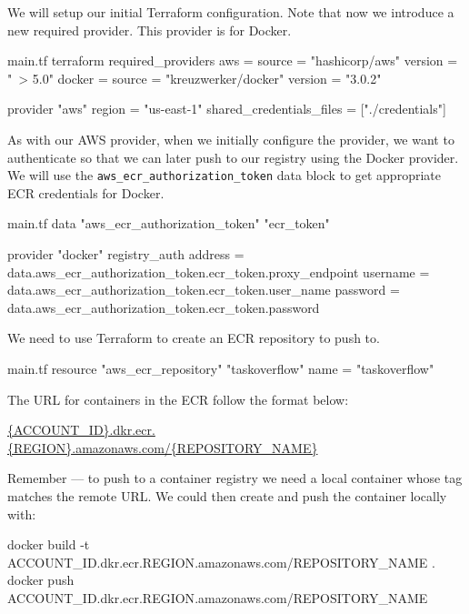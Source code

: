 \documentclass{csse4400}
\begin{document}
We will setup our initial Terraform configuration.
Note that now we introduce a new required provider.
This provider is for Docker.

\begin{code}[language=terraform,numbers=none]{main.tf}
terraform {
   required_providers {
      aws = {
         source = "hashicorp/aws"
         version = "~> 5.0"
      }
      docker = {
         source  = "kreuzwerker/docker"
         version = "3.0.2"
      }
   }
}

provider "aws" {
   region = "us-east-1"
   shared_credentials_files = ["./credentials"]
}
\end{code}

As with our AWS provider,
when we initially configure the provider,
we want to authenticate so that we can later push to our registry using the Docker provider.
We will use the \texttt{aws\_ecr\_authorization\_token} data block to get appropriate ECR credentials for Docker.

\begin{code}[language=terraform,numbers=none]{main.tf}
data "aws_ecr_authorization_token" "ecr_token" {}

provider "docker" {
  registry_auth {
    address  = data.aws_ecr_authorization_token.ecr_token.proxy_endpoint
    username = data.aws_ecr_authorization_token.ecr_token.user_name
    password = data.aws_ecr_authorization_token.ecr_token.password
  }
}
\end{code}

We need to use Terraform to create an ECR repository to push to.

\begin{code}[language=terraform,numbers=none]{main.tf}
resource "aws_ecr_repository" "taskoverflow" {
  name = "taskoverflow"
}
\end{code}

\noindent
The URL for containers in the ECR follow the format below:

\url{{ACCOUNT_ID}.dkr.ecr.{REGION}.amazonaws.com/{REPOSITORY_NAME}}

Remember --- to push to a container registry
we need a local container whose tag matches the remote URL.
We could then create and push the container locally with:

\begin{code}[language=bash,numbers=none]{}
docker build -t {ACCOUNT_ID}.dkr.ecr.{REGION}.amazonaws.com/{REPOSITORY_NAME} .
docker push {ACCOUNT_ID}.dkr.ecr.{REGION}.amazonaws.com/{REPOSITORY_NAME} 
\end{code}
\end{document}
